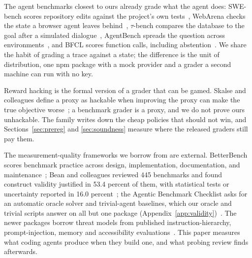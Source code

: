 The agent benchmarks closest to ours already grade what the agent does: SWE-bench scores repository edits against the project's own tests~\cite{jimenez2024swebench}, WebArena checks the state a browser agent leaves behind~\cite{zhou2024webarena}, $\tau$-bench compares the database to the goal after a simulated dialogue~\cite{yao2025taubench}, AgentBench spreads the question across environments~\cite{liu2024agentbench}, and BFCL scores function calls, including abstention~\cite{patil2025bfcl}. We share the habit of grading a trace against a state; the difference is the unit of distribution, one npm package with a mock provider and a grader a second machine can run with no key.

Reward hacking is the formal version of a grader that can be gamed. Skalse and colleagues define a proxy as hackable when improving the proxy can make the true objective worse~\cite{skalse2022hacking}; a benchmark grader is a proxy, and we do not prove ours unhackable. The family writes down the cheap policies that should not win, and Sections~\ref{sec:prereg} and \ref{sec:soundness} measure where the released graders still pay them.

The measurement-quality frameworks we borrow from are external. BetterBench scores benchmark practice across design, implementation, documentation, and maintenance~\cite{reuel2024betterbench}; Bean and colleagues reviewed 445 benchmarks and found construct validity justified in 53.4 percent of them, with statistical tests or uncertainty reported in 16.0 percent~\cite{bean2025construct}; the Agentic Benchmark Checklist asks for an automatic oracle solver and trivial-agent baselines, which our oracle and trivial scripts answer on all but one package (Appendix~\ref{app:validity})~\cite{zhu2025abc}. The newer packages borrow threat models from published instruction-hierarchy, prompt-injection, memory and accessibility evaluations~\cite{wallace2024instruction,zhang2025iheval,debenedetti2024agentdojo,in2026permembench,w3c2024wcag22}. This paper measures what coding agents produce when they build one, and what probing review finds afterwards.
